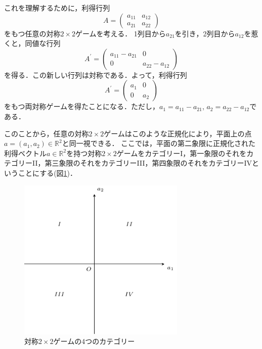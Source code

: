 \documentclass{jsreport}
\begin{document}
これを理解するために，利得行列
\begin{equation}
  A = \left(
    \begin{array}{cc}
      a_{11} & a_{12} \\
      a_{21} & a_{22}
    \end{array}
  \right) \label{eq:profit_t}
\end{equation}
をもつ任意の対称$2 \times 2$ゲームを考える．
1列目から$a_{21}$を引き，2列目から$a_{12}$を惹くと，同値な行列
\begin{equation}
  A^{\prime} = \left(
  \begin{array}{cc}
    a_{11} - a_{21} & 0 \\
    0 & a_{22} - a_{12}
  \end{array}
  \right) \label{eq:prof_equiv}
\end{equation}
を得る．この新しい行列は対称である．よって，利得行列
\begin{equation}
  A^{\prime} = \left(
  \begin{array}{cc}
    a_1 & 0 \\
    0 & a_2
  \end{array}
  \right) \label{eq:equiv_rewrite}
\end{equation}
をもつ両対称ゲームを得たことになる．ただし，$a_1 = a_{11} - a_{21}$, $a_2 = a_{22} - a_{12}$である．

このことから，任意の対称$2 \times 2$ゲームはこのような正規化により，平面上の点$a = (a_1, a_2) \in \mathbb{R}^2$と同一視できる．
ここでは，平面の第二象限に正規化された利得ベクトル$a \in \mathbb{R}^2$を持つ対称$2 \times 2$ゲームをカテゴリーI，第一象限のそれをカテゴリーII，第三象限のそれをカテゴリーIII，第四象限のそれをカテゴリーIVということにする(図\ref{fig:symmetric_game})．

\begin{figure}[htb]
  \centering
  \includegraphics[clip, width=8cm]{./fig/space_1.pdf}
  \caption{対称$2 \times 2$ゲームの4つのカテゴリー}
  \label{fig:symmetric_game}
\end{figure}
\end{document}
